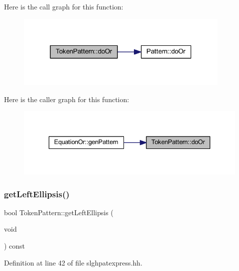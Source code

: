 Here is the call graph for this function\+:
\nopagebreak
\begin{figure}[H]
\begin{center}
\leavevmode
\includegraphics[width=292pt]{class_token_pattern_a9e4586d96306831e4c54930aa4097756_cgraph}
\end{center}
\end{figure}
Here is the caller graph for this function\+:
\nopagebreak
\begin{figure}[H]
\begin{center}
\leavevmode
\includegraphics[width=336pt]{class_token_pattern_a9e4586d96306831e4c54930aa4097756_icgraph}
\end{center}
\end{figure}
\mbox{\label{class_token_pattern_a210e879f22d138ce4729978c61c1ae07}} 
\subsubsection{\texorpdfstring{getLeftEllipsis()}{getLeftEllipsis()}}
{\footnotesize\ttfamily bool Token\+Pattern\+::get\+Left\+Ellipsis (\begin{DoxyParamCaption}\item[{void}]{ }\end{DoxyParamCaption}) const\hspace{0.3cm}{\ttfamily [inline]}}



Definition at line 42 of file slghpatexpress.\+hh.

